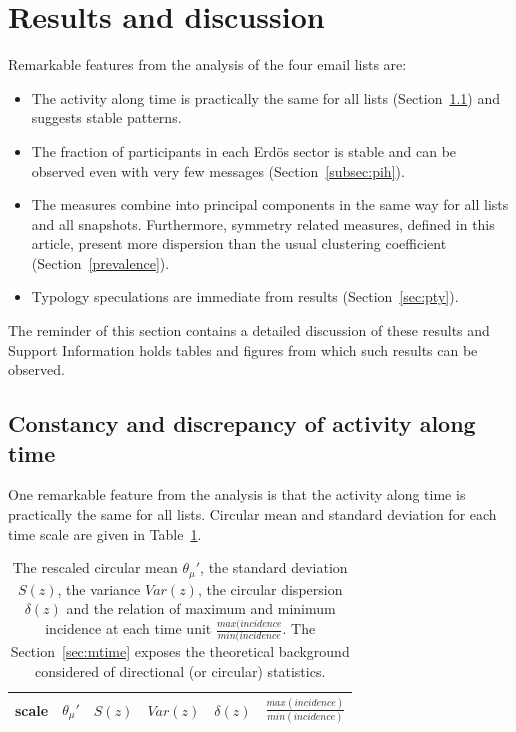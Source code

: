 \documentclass[%
 aip,
 jmp,%
 amsmath,amssymb,
 reprint,%
]{revtex4-1}
\begin{document}
\section{Results and discussion}\label{sec:results}

Remarkable features from the analysis of the four email lists are:
\begin{itemize}
    \item The activity along time is practically the same for all lists (Section~\ref{constDisc}) and suggests stable patterns.
    \item The fraction of participants in each Erd\"os sector is stable and can be observed even with very few messages (Section~\ref{subsec:pih}).
    \item The measures combine into principal components in the same way for all lists and all snapshots. 
	    Furthermore, symmetry related measures, defined in this article, present more dispersion than the usual clustering coefficient (Section~\ref{prevalence}).
    \item Typology speculations are immediate from results (Section~\ref{sec:pty}).
\end{itemize}

The reminder of this section contains a detailed discussion of these results and
Support Information holds tables and figures from which such results can be observed.

\subsection{Constancy and discrepancy of activity along time}\label{constDisc}
One remarkable feature from the analysis is that the activity 
along time is practically the same for all lists. Circular mean and standard deviation
for each time scale are given in Table~\ref{tab:circ}.

\begin{table}[t]
	\caption{The rescaled circular mean $\theta_\mu'$, the standard deviation $S(z)$, the variance $Var(z)$, the circular dispersion $\delta(z)$ and the relation of maximum and minimum incidence at each time unit $\frac{max(incidence}{min(incidence}$. The Section~\ref{sec:mtime} exposes the theoretical background considered of directional (or circular) statistics.}
\begin{center}
    \begin{tabular}{ |l|| c|c|c|c|c| }
        \hline
	scale & $\theta_\mu'$ & $S(z)$ & $Var(z)$ & $\delta(z)$ & $\frac{max(incidence)}{min(incidence)}$ \\ \hline\hline
	
    \end{tabular}
\end{center}
\label{tab:circ}
\end{table}
\end{document}
